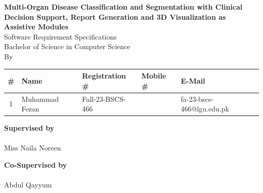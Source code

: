 \documentclass[12pt,a4paper]{report}
\begin{document}
\begin{titlepage}
    \centering

    \vspace*{0.3cm}
    {\fontsize{18pt}{22pt}\selectfont \textbf{Multi-Organ Disease Classification and Segmentation with Clinical Decision Support, Report Generation and 3D Visualization as Assistive Modules}}\\[1.2cm]

    {\fontsize{16pt}{20pt}\selectfont Software Requirement Specifications}\\[0.8cm]

    {\fontsize{14pt}{18pt}\selectfont Bachelor of Science in Computer Science}\\[0.8cm]

    {\fontsize{13pt}{16pt}\selectfont By}\\[0.6cm]

    \renewcommand{\arraystretch}{1.5}
    \begin{tabularx}{\textwidth}{|c|>{\centering\arraybackslash}p{3.5cm}|>{\centering\arraybackslash}p{3.2cm}|>{\centering\arraybackslash}p{2.8cm}|>{\centering\arraybackslash}X|}
        \hline
        \textbf{\#} & \textbf{Name} & \textbf{Registration \#} & \textbf{Mobile \#} & \textbf{E-Mail} \\
        \hline
        1 & Muhammad Fezan & Fall-23-BSCS-466 & 03097413565 & fa-23-bscs-466@lgu.edu.pk \\
        \hline
    \end{tabularx}

    \vspace{2.2cm}

    \noindent
    \begin{minipage}{0.48\textwidth}
        \centering
        \textbf{Supervised by}\\[1.5cm]
        \underline{\hspace{5cm}}\\[0.2cm]
        Miss Naila Noreen
    \end{minipage}
    \hfill
    \begin{minipage}{0.48\textwidth}
        \centering
        \textbf{Co-Supervised by}\\[1.5cm]
        \underline{\hspace{5cm}}\\[0.2cm]
        Abdul Qayyum
    \end{minipage}


\end{titlepage}
\end{document}
